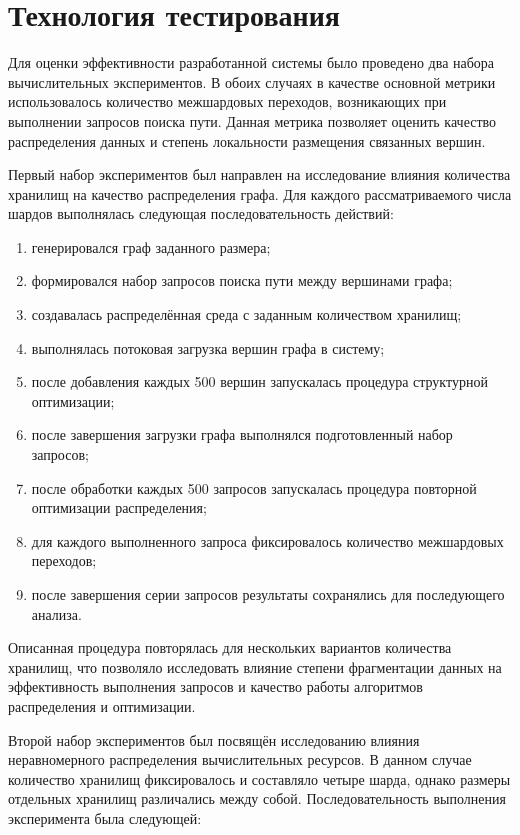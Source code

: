 \section{Технология тестирования} \label{technological_part}

Для оценки эффективности разработанной системы было проведено два набора вычислительных экспериментов. В обоих случаях в качестве основной метрики использовалось количество межшардовых переходов, возникающих при выполнении запросов поиска пути. Данная метрика позволяет оценить качество распределения данных и степень локальности размещения связанных вершин.

Первый набор экспериментов был направлен на исследование влияния количества хранилищ на качество распределения графа. Для каждого рассматриваемого числа шардов выполнялась следующая последовательность действий:
\begin{enumerate}
\item генерировался граф заданного размера;
\item формировался набор запросов поиска пути между вершинами графа;
\item создавалась распределённая среда с заданным количеством хранилищ;
\item выполнялась потоковая загрузка вершин графа в систему;
\item после добавления каждых 500 вершин запускалась процедура структурной оптимизации;
\item после завершения загрузки графа выполнялся подготовленный набор запросов;
\item после обработки каждых 500 запросов запускалась процедура повторной оптимизации распределения;
\item для каждого выполненного запроса фиксировалось количество межшардовых переходов;
\item после завершения серии запросов результаты сохранялись для последующего анализа.
\end{enumerate}

Описанная процедура повторялась для нескольких вариантов количества хранилищ, что позволяло исследовать влияние степени фрагментации данных на эффективность выполнения запросов и качество работы алгоритмов распределения и оптимизации.

Второй набор экспериментов был посвящён исследованию влияния неравномерного распределения вычислительных ресурсов. В данном случае количество хранилищ фиксировалось и составляло четыре шарда, однако размеры отдельных хранилищ различались между собой. Последовательность выполнения эксперимента была следующей:

